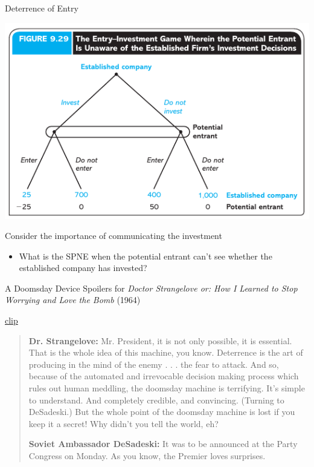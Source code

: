 \begin{frame}{Deterrence of Entry}
  \begin{center}
    \includegraphics[width=.7\textwidth]{figures/fig929.png} 
  \end{center}
  Consider the importance of communicating the investment
  \begin{itemize}
    \item What is the SPNE when the potential entrant can't see whether the established company has invested? 
  \end{itemize}
\end{frame}

\begin{frame}{A Doomsday Device}
  Spoilers for \textit{Doctor Strangelove or: How I Learned to Stop Worrying and Love the Bomb} (1964)
  \begin{itemize}
    \href{https://youtu.be/2yfXgu37iyI}{clip} 
  \end{itemize}
  \begin{quote}
    \footnotesize
    \textbf{Dr. Strangelove:} Mr. President, it is not only possible, it is essential. That is the whole idea of this machine, you know. Deterrence is the art of producing in the mind of the enemy . . . the fear to attack. And so, because of the automated and irrevocable decision making process which rules out human meddling, the doomsday machine is terrifying. It’s simple to understand. And completely credible, and convincing. (Turning to DeSadeski.) But the whole point of the doomsday machine is lost if you keep it a secret! Why didn’t you tell the world, eh?

    \textbf{Soviet Ambassador DeSadeski:} It was to be announced at the Party Congress on Monday. As you know, the Premier loves surprises.
  \end{quote}
\end{frame}


